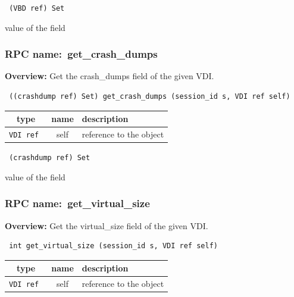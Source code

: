 \vspace{0.3cm}

{\tt 
(VBD ref) Set
}


value of the field
\vspace{0.3cm}
\vspace{0.3cm}
\vspace{0.3cm}
\subsubsection{RPC name:~get\_crash\_dumps}

{\bf Overview:} 
Get the crash\_dumps field of the given VDI.

\begin{verbatim} ((crashdump ref) Set) get_crash_dumps (session_id s, VDI ref self)\end{verbatim}



 
\vspace{0.3cm}
\begin{tabular}{|c|c|p{7cm}|}
 \hline
{\bf type} & {\bf name} & {\bf description} \\ \hline
{\tt VDI ref } & self & reference to the object \\ \hline 

\end{tabular}

\vspace{0.3cm}

{\tt 
(crashdump ref) Set
}


value of the field
\vspace{0.3cm}
\vspace{0.3cm}
\vspace{0.3cm}
\subsubsection{RPC name:~get\_virtual\_size}

{\bf Overview:} 
Get the virtual\_size field of the given VDI.

\begin{verbatim} int get_virtual_size (session_id s, VDI ref self)\end{verbatim}



 
\vspace{0.3cm}
\begin{tabular}{|c|c|p{7cm}|}
 \hline
{\bf type} & {\bf name} & {\bf description} \\ \hline
{\tt VDI ref } & self & reference to the object \\ \hline 

\end{tabular}

